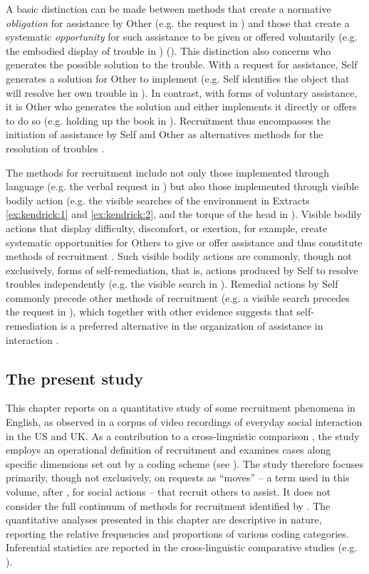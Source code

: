 \documentclass[output=paper,nonflat,modfont,draft]{langsci/langscibook}
\begin{document}
A basic distinction can be made between methods that create a normative \textit{obligation} for assistance by Other (e.g. the request in ) and those that create a systematic \textit{opportunity} for such assistance to be given or offered voluntarily (e.g. the embodied display of trouble in ) (\citealt{KendrickDrew2014, KendrickDrew2016}). This distinction also concerns who generates the possible solution to the trouble. With a request for assistance, Self generates a solution for Other to implement (e.g. Self identifies the object that will resolve her own trouble in ). In contrast, with forms of voluntary assistance, it is Other who generates the solution and either implements it directly or offers to do so (e.g. holding up the book in ). Recruitment thus encompasses the initiation of assistance by Self and Other as alternatives methods for the resolution of troubles \citep{KendrickDrew2016}.

The methods for recruitment include not only those implemented through language (e.g. the verbal request in ) but also those implemented through visible bodily action (e.g. the visible searches of the environment in Extracts \ref{ex:kendrick:1} and \ref{ex:kendrick:2}, and the torque of the head in ). Visible bodily actions that display difficulty, discomfort, or exertion, for example, create systematic opportunities for Others to give or offer assistance and thus constitute methods of recruitment \citep{KendrickDrew2016}. Such visible bodily actions are commonly, though not exclusively, forms of self-remediation, that is, actions produced by Self to resolve troubles independently (e.g. the visible search in ). Remedial actions by Self commonly precede other methods of recruitment (e.g. a visible search precedes the request in ), which together with other evidence suggests that self-remediation is a preferred alternative in the organization of assistance in interaction \citep{Kendrick2017}.

\subsection{The present study}
This chapter reports on a quantitative study of some recruitment phenomena in English, as observed in a corpus of video recordings of everyday social interaction in the US and UK. As a contribution to a cross-linguistic comparison \citep{FloydEtAl2014b}, the study employs an operational definition of recruitment and examines cases along specific dimensions set out by a coding scheme (see ). The study therefore focuses primarily, though not exclusively, on requests as “moves” -- a term used in this volume, after \citet{Goffman1969}, for social actions -- that recruit others to assist. It does not consider the full continuum of methods for recruitment identified by \citet{KendrickDrew2016}. The quantitative analyses presented in this chapter are descriptive in nature, reporting the relative frequencies and proportions of various coding categories. Inferential statistics are reported in the cross-linguistic comparative studies (e.g. \citealt{FloydEtAl2018}).
\end{document}
